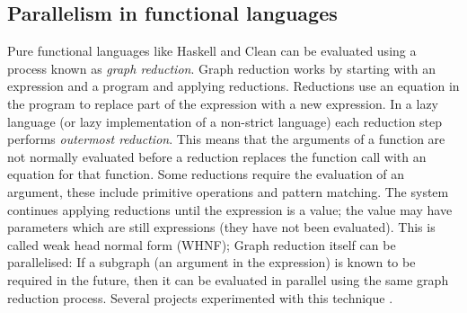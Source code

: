 
\subsection{Parallelism in functional languages}
\label{sec:intro_par_func}


Pure functional languages like Haskell and Clean can be evaluated using a
process known as \emph{graph reduction}.
Graph reduction works by starting with an expression and a program and
applying reductions.
Reductions use an equation in the program to replace part of the expression
with a new expression.
In a lazy language (or lazy implementation of a non-strict language) 
each reduction step performs \emph{outermost reduction}.
This means that the arguments of a function are not normally evaluated
before a reduction replaces the function call with an equation for that
function.
Some reductions require the evaluation of an argument,
these include primitive operations and pattern matching.
The system continues applying reductions until the expression is 
a value;
the value may have parameters which are still expressions (they have not
been evaluated).
This is called weak head normal form (WHNF);
Graph reduction itself can be parallelised:
If a subgraph (an argument in the expression) is known to be required in the
future,
then it can be evaluated in parallel using the same graph reduction process.
Several projects experimented with this technique
\citep{augustsson:1989:parallel-graph-reduction,burn:1989:parallel-reduction-machine,peyton-jones:1989:parallel-graph-reduction}.

